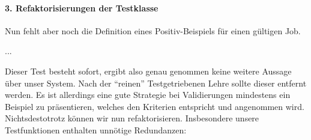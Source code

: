 \paragraph{3. Refaktorisierungen der Testklasse}
Nun fehlt aber noch die Definition eines Positiv-Beispiels für einen gültigen Job.

\begin{ruby}[label=test/unit/job\_test.rb]
...
  
          
   
\end{ruby}
\tddgreen
Dieser Test besteht sofort, ergibt also genau genommen keine weitere Aussage über unser System. Nach der "`reinen"' Testgetriebenen Lehre sollte dieser entfernt werden. Es ist allerdings eine gute Strategie bei Validierungen mindestens ein Beispiel zu präsentieren, welches den Kriterien entspricht und angenommen wird. Nichtsdestotrotz können wir nun refaktorisieren. Insbesondere unsere Testfunktionen enthalten unnötige Redundanzen:

